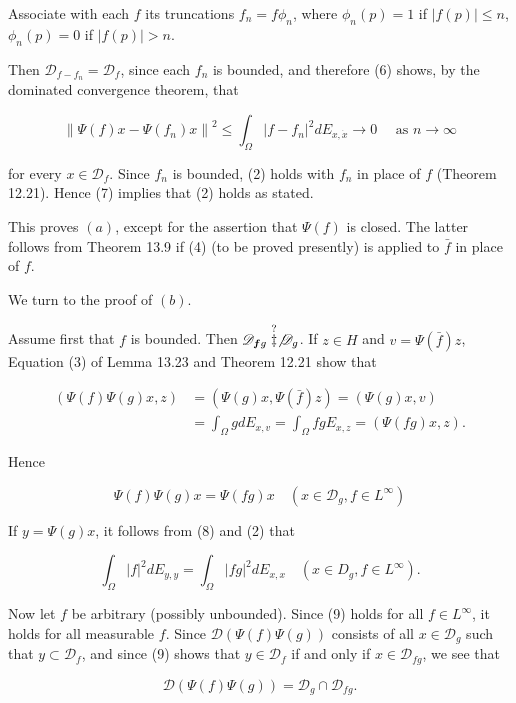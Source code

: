 \documentclass[10pt]{article}
\begin{document}
Associate with each $f$ its truncations $f_{n}=f \phi_{n}$, where $\phi_{n}(p)=1$ if $|f(p)| \leq n$, $\phi_{n}(p)=0$ if $|f(p)|>n$.

Then $\mathscr{D}_{f-f_{n}}=\mathscr{D}_{f}$, since each $f_{n}$ is bounded, and therefore (6) shows, by the dominated convergence theorem, that

$$
\left\|\Psi(f) x-\Psi\left(f_{n}\right) x\right\|^{2} \leq \int_{\Omega}\left|f-f_{n}\right|^{2} d E_{x, \dot{x}} \rightarrow 0 \quad \text { as } n \rightarrow \infty
$$

for every $x \in \mathscr{D}_{f}$. Since $f_{n}$ is bounded, (2) holds with $f_{n}$ in place of $f$ (Theorem 12.21). Hence (7) implies that (2) holds as stated.

This proves $(a)$, except for the assertion that $\Psi(f)$ is closed. The latter follows from Theorem 13.9 if (4) (to be proved presently) is applied to $\bar{f}$ in place of $f$.

We turn to the proof of $(b)$.

Assume first that $f$ is bounded. Then $\mathscr{D}_{\boldsymbol{f} g} \stackrel{?}{\ddagger} \not \mathscr{D}_{g}$. If $z \in H$ and $v=\Psi(\bar{f}) z$, Equation (3) of Lemma 13.23 and Theorem 12.21 show that

$$
\begin{aligned}
(\Psi(f) \Psi(g) x, z) & =(\Psi(g) x, \Psi(\bar{f}) z)=(\Psi(g) x, v) \\
& =\int_{\Omega} g d E_{x, v}=\int_{\Omega} f g E_{x, z}=(\Psi(f g) x, z) .
\end{aligned}
$$

Hence

$$
\Psi(f) \Psi(g) x=\Psi(f g) x \quad\left(x \in \mathscr{D}_{g}, f \in L^{\infty}\right)
$$

If $y=\Psi(g) x$, it follows from (8) and (2) that

$$
\int_{\Omega}|f|^{2} d E_{y, y}=\int_{\Omega}|f g|^{2} d E_{x, x} \quad\left(x \in D_{g}, f \in L^{\infty}\right) .
$$

Now let $f$ be arbitrary (possibly unbounded). Since (9) holds for all $f \in L^{\infty}$, it holds for all measurable $f$. Since $\mathscr{D}(\Psi(f) \Psi(g))$ consists of all $x \in \mathscr{D}_{g}$ such that $y \subset \mathscr{D}_{f}$, and since (9) shows that $y \in \mathscr{D}_{f}$ if and only if $x \in \mathscr{D}_{f g}$, we see that

$$
\mathscr{D}(\Psi(f) \Psi(g))=\mathscr{D}_{g} \cap \mathscr{D}_{f g} .
$$
\end{document}
